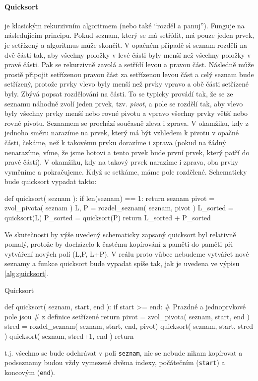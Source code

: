 \paragraph{Quicksort} je klasickým rekurzivním algoritmem (nebo také ``rozděl a panuj''). Funguje na
následujícím principu. Pokud seznam, který se má setřídit, má pouze jeden prvek, je setřízený a algoritmus
může skončit. V opačném případě si seznam rozdělí na dvě části tak, aby všechny položky v levé části byly 
menší než všechny položky v pravé části. Pak se rekurzivně zavolá a setřídí
levou a pravou část. Následně může prostě připojit setřízenou pravou část za setřízenou levou část
a celý seznam bude setřízený, protože prvky vlevo byly menší než prvky vpravo a obě části setřízené
byly. Zbývá popsat rozdělování na části. To se typicky provádí tak, že se ze seznamu náhodně zvolí jeden
prvek, tzv. \emph{pivot}, a pole se rozdělí tak, aby vlevo byly všechny prvky menší nebo rovné pivotu
a vpravo všechny prvky větší nebo rovné pivotu. Seznamem se prochází současně zleva i zprava. V okamžiku, kdy z 
jednoho směru narazíme na prvek, který má být vzhledem k pivotu v opačné části, čekáme, než k takovému
prvku dorazíme i zprava (pokud na žádný nenarazíme, víme, že jsme hotovi a tento prvek bude první prvek,
který patří do pravé části). V okamžiku, kdy na takový prvek narazíme i zprava, oba prvky vyměníme
a pokračujeme. Když se setkáme, máme pole rozdělené. Schematicky bude quicksort vypadat takto:

\begin{python}
def quicksort( seznam ):
    if len(seznam) == 1:
      return seznam
    pivot = zvol_pivota( seznam )
    L, P = rozdel_seznam( seznam, pivot )
    L_sorted = quicksort(L)
    P_sorted = quicksort(P)
    return L_sorted + P_sorted
\end{python}

\begin{remark*} Ve skutečnosti by výše uvedený schematicky zapsaný quicksort byl relativně pomalý,
protože by docházelo k častému kopírování z paměti do paměti při vytváření nových polí (L,P, L+P).
V reálu proto vůbec nebudeme vytvářet nové seznamy a funkce quicksort bude vypadat spíše tak, jak je uvedena ve výpisu \ref{alg:quicksort}.

\begin{program}\caption{Quicksort}\label{alg:quicksort}
\begin{python}
def quicksort( seznam, start, end ):
    if start >= end:
        # Prazdné a jednoprvkové pole jsou
        # z definice setřízené
        return  
    pivot = zvol_pivota( seznam, start, end )
    stred = rozdel_seznam( seznam, start, end, pivot)
    quicksort( seznam, start, stred )
    quicksort( seznam, stred+1, end )
    return
\end{python}
\end{program}

t.j. všechno se bude odehrávat v poli {\tt seznam}, nic se nebude nikam kopírovat a podseznamy budou
vždy vymezené dvěma indexy, počátečním ({\tt start}) a koncovým ({\tt end}).
\end{remark*}

